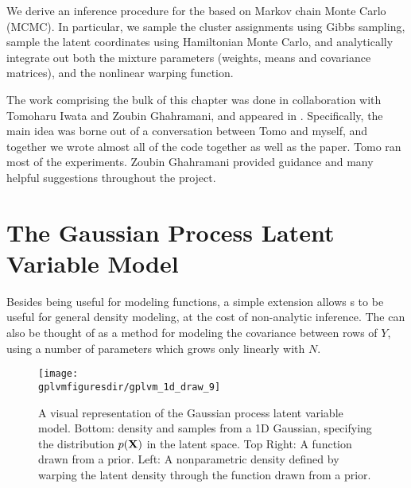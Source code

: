 We derive an inference procedure for the \iwmm{} based on Markov chain Monte Carlo (MCMC).  In particular, we sample the cluster assignments using Gibbs sampling, sample the latent coordinates using Hamiltonian Monte Carlo, and analytically integrate out both the mixture parameters (weights, means and covariance matrices), and the nonlinear warping function. 


The work comprising the bulk of this chapter was done in collaboration with Tomoharu Iwata and Zoubin Ghahramani, and appeared in \citep{IwaDuvGha12}.
Specifically, the main idea was borne out of a conversation between Tomo and myself, and together we wrote almost all of the code together as well as the paper.
Tomo ran most of the experiments.
Zoubin Ghahramani provided guidance and many helpful suggestions throughout the project.



\section{The Gaussian Process Latent Variable Model}


Besides being useful for modeling functions, a simple extension allows \gp{}s to be useful for general density modeling, at the cost of non-analytic inference.
The \gplvm{} can also be thought of as a method for modeling the covariance between rows of $Y$, using a number of parameters which grows only linearly with $N$.


\begin{figure}[t]
\begin{centering}
\texttt{[image: \\gplvmfiguresdir/gplvm\_1d\_draw\_9]}
\end{centering}
\caption[One-dimensional Gaussian process latent variable model]{A visual representation of the Gaussian process latent variable model.  Bottom: density and samples from a 1D Gaussian, specifying the distribution $p(\mathbf{X})$ in the latent space.  Top Right: A function drawn from a \gp{} prior.  Left: A nonparametric density defined by warping the latent density through the function drawn from a \gp{} prior.}  
\label{fig:oned-gplvm}
\end{figure}



